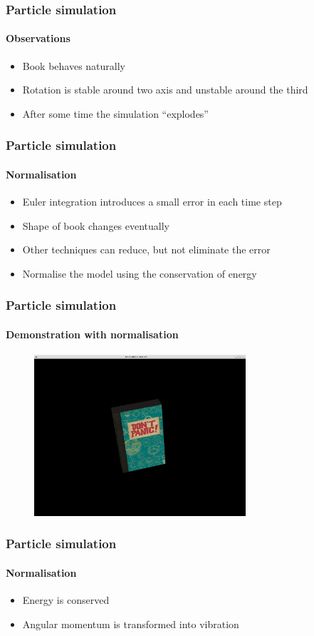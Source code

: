 \documentclass{beamer}
\begin{document}
\begin{frame}
 \frametitle{Particle simulation}
 \framesubtitle{Observations}
 \begin{itemize}
  \item Book behaves naturally
  \item Rotation is stable around two axis and unstable around the third
  \item After some time the simulation ``explodes''
 \end{itemize}
\end{frame}

\begin{frame}
 \frametitle{Particle simulation}
 \framesubtitle{Normalisation}
 \begin{itemize}
  \item Euler integration introduces a small error in each time step
  \item Shape of book changes eventually
  \item Other techniques can reduce, but not eliminate the error
  \item Normalise the model using the conservation of energy
 \end{itemize}
\end{frame}

\begin{frame}
 \frametitle{Particle simulation}
 \framesubtitle{Demonstration with normalisation}
 \begin{figure}
  \centering
  \includegraphics[width=0.7\textwidth]{demo.jpg}
 \end{figure}
\end{frame}

\begin{frame}
 \frametitle{Particle simulation}
 \framesubtitle{Normalisation}
 \begin{itemize}
  \item Energy is conserved
  \item Angular momentum is transformed into vibration
 \end{itemize}
\end{frame}
\end{document}
